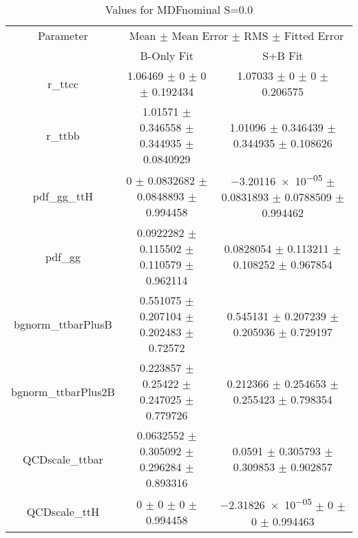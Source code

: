 \begin{table}
\centering
\caption{Values for MDFnominal S=0.0}
\begin{tabular}{ccc}
\toprule
Parameter & \multicolumn{2}{c}{Mean $\pm$ Mean Error $\pm$ RMS $\pm$ Fitted Error}\\
 & B-Only Fit & S+B Fit\\
\midrule
r\_ttcc & \num{1.06469} $\pm$ \num{0} $\pm$ \num{0} $\pm$ \num{0.192434} & \num{1.07033} $\pm$ \num{0} $\pm$ \num{0} $\pm$ \num{0.206575}\\
r\_ttbb & \num{1.01571} $\pm$ \num{0.346558} $\pm$ \num{0.344935} $\pm$ \num{0.0840929} & \num{1.01096} $\pm$ \num{0.346439} $\pm$ \num{0.344935} $\pm$ \num{0.108626}\\
pdf\_gg\_ttH & \num{0} $\pm$ \num{0.0832682} $\pm$ \num{0.0848893} $\pm$ \num{0.994458} & \num{-3.20116e-05} $\pm$ \num{0.0831893} $\pm$ \num{0.0788509} $\pm$ \num{0.994462}\\
pdf\_gg & \num{0.0922282} $\pm$ \num{0.115502} $\pm$ \num{0.110579} $\pm$ \num{0.962114} & \num{0.0828054} $\pm$ \num{0.113211} $\pm$ \num{0.108252} $\pm$ \num{0.967854}\\
bgnorm\_ttbarPlusB & \num{0.551075} $\pm$ \num{0.207104} $\pm$ \num{0.202483} $\pm$ \num{0.72572} & \num{0.545131} $\pm$ \num{0.207239} $\pm$ \num{0.205936} $\pm$ \num{0.729197}\\
bgnorm\_ttbarPlus2B & \num{0.223857} $\pm$ \num{0.25422} $\pm$ \num{0.247025} $\pm$ \num{0.779726} & \num{0.212366} $\pm$ \num{0.254653} $\pm$ \num{0.255423} $\pm$ \num{0.798354}\\
QCDscale\_ttbar & \num{0.0632552} $\pm$ \num{0.305092} $\pm$ \num{0.296284} $\pm$ \num{0.893316} & \num{0.0591} $\pm$ \num{0.305793} $\pm$ \num{0.309853} $\pm$ \num{0.902857}\\
QCDscale\_ttH & \num{0} $\pm$ \num{0} $\pm$ \num{0} $\pm$ \num{0.994458} & \num{-2.31826e-05} $\pm$ \num{0} $\pm$ \num{0} $\pm$ \num{0.994463}\\
\bottomrule
\end{tabular}
\end{table}